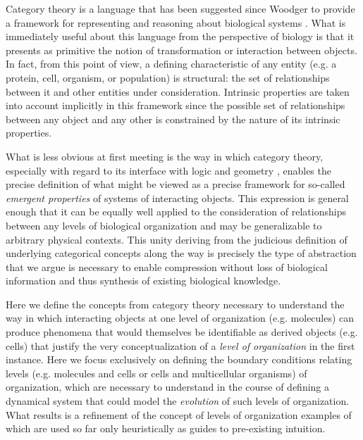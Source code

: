 \documentclass[aps,twocolumn]{revtex4}
\begin{document}
Category theory \cite{Lane1985,Lane1998,MacLane1992,Lawvere1997,Lawvere2003,Awodey2006} is a language that has been suggested since Woodger to provide a framework for representing and reasoning about biological systems \cite{GOGUEN1979,Ehresmann2007,Louie2009}. What is immediately useful about this language from the perspective of biology is that it presents as primitive the notion of transformation or interaction between objects. In fact, from this point of view, a defining characteristic of any entity (e.g. a protein, cell, organism, or population) is structural: the set of relationships between it and other entities under consideration. Intrinsic properties are taken into account implicitly in this framework since the possible set of relationships between any object and any other is constrained by the nature of its intrinsic properties. 

What is less obvious at first meeting is the way in which category theory, especially with regard to its interface with logic and geometry \cite{MacLane1992,Jacobs1998}, enables the precise definition of what might be viewed as a precise framework for so-called \emph{emergent properties} of systems of interacting objects. This expression is general enough that it can be equally well applied to the consideration of relationships between any levels of biological organization and may be generalizable to arbitrary physical contexts. This unity deriving from the judicious definition of underlying categorical concepts along the way is precisely the type of abstraction that we argue is necessary to enable compression without loss of biological information and thus synthesis of existing biological knowledge.

Here we define the concepts from category theory necessary to understand the way in which interacting objects at one level of organization (e.g. molecules) can produce phenomena that would themselves be identifiable as derived objects (e.g. cells) that justify the very conceptualization of a \emph{level of organization} in the first instance. Here we focus exclusively on defining the boundary conditions relating levels (e.g. molecules and cells or cells and multicellular organisms) of organization, which are necessary to understand in the course of defining a dynamical system that could model the \emph{evolution} of such levels of organization. What results is a refinement of the concept of levels of organization examples of which are used so far only heuristically as guides to pre-existing intuition.
\end{document}
